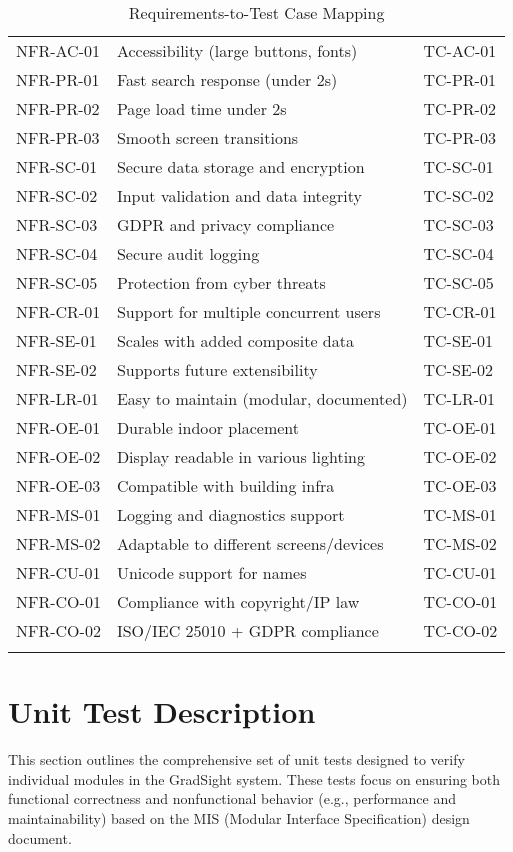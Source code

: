 \documentclass[12pt, titlepage]{article}
\begin{document}
\begin{longtable}{|p{3cm}|p{7cm}|p{4cm}|}
NFR-AC-01 & Accessibility (large buttons, fonts) & TC-AC-01 \\
NFR-PR-01 & Fast search response (under 2s) & TC-PR-01 \\
NFR-PR-02 & Page load time under 2s & TC-PR-02 \\
NFR-PR-03 & Smooth screen transitions & TC-PR-03 \\
NFR-SC-01 & Secure data storage and encryption & TC-SC-01 \\
NFR-SC-02 & Input validation and data integrity & TC-SC-02 \\
NFR-SC-03 & GDPR and privacy compliance & TC-SC-03 \\
NFR-SC-04 & Secure audit logging & TC-SC-04 \\
NFR-SC-05 & Protection from cyber threats & TC-SC-05 \\
NFR-CR-01 & Support for multiple concurrent users & TC-CR-01 \\
NFR-SE-01 & Scales with added composite data & TC-SE-01 \\
NFR-SE-02 & Supports future extensibility & TC-SE-02 \\
NFR-LR-01 & Easy to maintain (modular, documented) & TC-LR-01 \\
NFR-OE-01 & Durable indoor placement & TC-OE-01 \\
NFR-OE-02 & Display readable in various lighting & TC-OE-02 \\
NFR-OE-03 & Compatible with building infra & TC-OE-03 \\
NFR-MS-01 & Logging and diagnostics support & TC-MS-01 \\
NFR-MS-02 & Adaptable to different screens/devices & TC-MS-02 \\
NFR-CU-01 & Unicode support for names & TC-CU-01 \\
NFR-CO-01 & Compliance with copyright/IP law & TC-CO-01 \\
NFR-CO-02 & ISO/IEC 25010 + GDPR compliance & TC-CO-02 \\
\hline
\caption{Requirements-to-Test Case Mapping}
\end{longtable}

\section{Unit Test Description}

This section outlines the comprehensive set of unit tests designed to verify individual modules in the GradSight system. These tests focus on ensuring both functional correctness and nonfunctional behavior (e.g., performance and maintainability) based on the MIS (Modular Interface Specification) design document.
\end{document}
